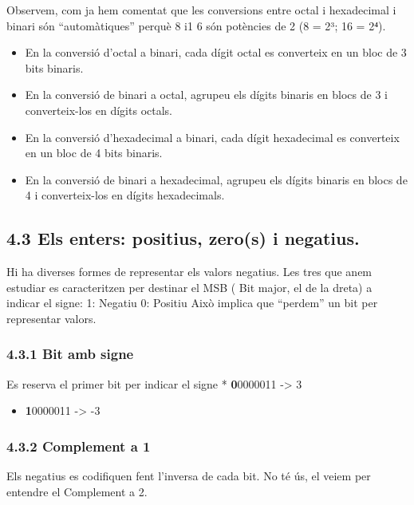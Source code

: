 \documentclass[
  12 pt,
  a4paper,
]{article}
\providecommand{\tightlist}{%
  \setlength{\itemsep}{0pt}\setlength{\parskip}{0pt}}
\begin{document}
Observem, com ja hem comentat que les conversions entre octal i
hexadecimal i binari són ``automàtiques'' perquè 8 i1 6 són potències de
2 (8 = 2³; 16 = 2⁴).

\begin{itemize}
\item
  En la conversió d'octal a binari, cada dígit octal es converteix en un
  bloc de 3 bits binaris.
\item
  En la conversió de binari a octal, agrupeu els dígits binaris en blocs
  de 3 i converteix-los en dígits octals.
\item
  En la conversió d'hexadecimal a binari, cada dígit hexadecimal es
  converteix en un bloc de 4 bits binaris.
\item
  En la conversió de binari a hexadecimal, agrupeu els dígits binaris en
  blocs de 4 i converteix-los en dígits hexadecimals.
\end{itemize}

\subsection{4.3 Els enters: positius, zero(s) i
negatius.}\label{els-enters-positius-zeros-i-negatius.}

Hi ha diverses formes de representar els valors negatius. Les tres que
anem estudiar es caracteritzen per destinar el MSB ( Bit major, el de la
dreta) a indicar el signe: 1: Negatiu 0: Positiu Això implica que
``perdem'' un bit per representar valors.

\subsubsection{4.3.1 Bit amb signe}\label{bit-amb-signe}

Es reserva el primer bit per indicar el signe * \textbf{0}0000011
-\textgreater{} 3

\begin{itemize}
\tightlist
\item
  \textbf{1}0000011 -\textgreater{} -3
\end{itemize}

\subsubsection{4.3.2 Complement a 1}\label{complement-a-1}

Els negatius es codifiquen fent l'inversa de cada bit. No té ús, el
veiem per entendre el Complement a 2.
\end{document}

